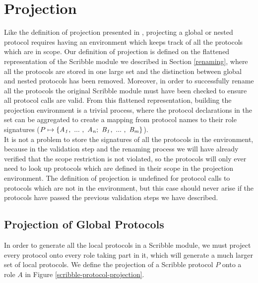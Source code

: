 \documentclass[12pt,twoside]{report}
\begin{document}
\section{Projection}\label{scribble-projection}
Like the definition of projection presented in \cite{nestedprotocols}, projecting a global or nested protocol requires having an environment which keeps track of all the protocols which are in scope. Our definition of projection is defined on the flattened representation of the Scribble module we described in Section \ref{renaming}, where all the protocols are stored in one large set and the distinction between global and nested protocols has been removed. Moreover, in order to successfully rename all the protocols the original Scribble module must have been checked to ensure all protocol calls are valid. From this flattened representation, building the projection environment is a trivial process, where the protocol declarations in the set can be aggregated to create a mapping from protocol names to their role signatures ($P \mapsto \{\roles{A}{n};\ \roles{B}{m}\}$).\\

It is not a problem to store the signatures of all the protocols in the environment, because in the validation step and the renaming process we will have already verified that the scope restriction is not violated, so the protocols will only ever need to look up protocols which are defined in their scope in the projection environment. The definition of projection is undefined for protocol calls to protocols which are not in the environment, but this case should never arise if the protocols have passed the previous validation steps we have described.

\subsection{Projection of Global Protocols}

In order to generate all the local protocols in a Scribble module, we must project every protocol onto every role taking part in it, which will generate a much larger set of local protocols. We define the projection of a Scribble protocol $P$ onto a role $A$ in Figure \ref{scribble-protocol-projection}.
\end{document}
